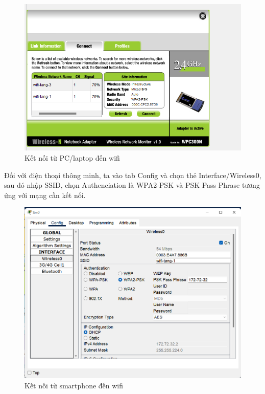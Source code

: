 \begin{enumerate}
\begin{enumerate}
\begin{figure}[H]
\begin{center}
\includegraphics[scale=.6]{../figures/p2/ap7}
\end{center}
\caption{Kết nối từ PC/laptop đến wifi}
\end{figure}

Đối với điện thoại thông minh, ta vào tab Config và chọn thẻ Interface/Wireless0, sau đó nhập SSID, chọn Authenciation là WPA2-PSK và PSK Pass Phrase tương ứng với mạng cần kết nối.

\begin{figure}[H]
\begin{center}
\includegraphics[scale=.6]{../figures/p2/ap10}
\end{center}
\caption{Kết nối từ smartphone đến wifi}
\end{figure}


\end{enumerate}
\end{enumerate}
